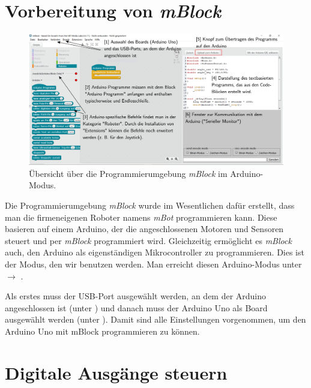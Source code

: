 \section{Vorbereitung von \emph{mBlock}}

\begin{figure}[H]
	\begin{adjustwidth*}{-1.5cm}{-1.5cm}
		\centering
		\includegraphics[width=1.2\textwidth]{pics/mblock-arduinomodus.PNG}
		\caption{Übersicht über die Programmierumgebung \emph{mBlock} im Arduino-Modus.}
		\label{abb:mblock-arduinomodus}
	\end{adjustwidth*}
\end{figure}

Die Programmierumgebung \emph{mBlock} wurde im Wesentlichen dafür erstellt, dass man die firmeneigenen Roboter namens \emph{mBot} programmieren kann. Diese basieren auf einem Arduino, der die angeschlossenen Motoren und Sensoren steuert und per \emph{mBlock} programmiert wird. Gleichzeitig ermöglicht es \emph{mBlock} auch, den Arduino als eigenständigen Mikrocontroller zu programmieren. Dies ist der Modus, den wir benutzen werden. Man erreicht diesen Arduino-Modus unter  $\rightarrow$ . 

Als erstes muss der USB-Port ausgewählt werden, an dem der Arduino angeschlossen ist (unter ) und danach muss der Arduino Uno als Board ausgewählt werden (unter ). Damit sind alle Einstellungen vorgenommen, um den Arduino Uno mit mBlock programmieren zu können.

\newpage
\section{Digitale Ausgänge steuern}

